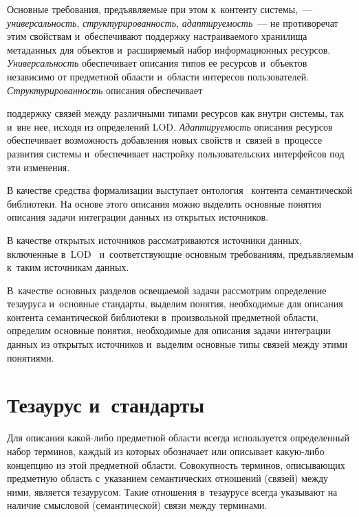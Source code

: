 \begin{multicols}{2}
     Основные требования, предъявляемые при этом к~контенту  
системы,~--- \textit{универсальность}, \textit{структурированность}, 
\textit{адаптируемость}~--- не противоречат этим свойствам и~обеспечивают 
поддержку настраиваемого хранилища метаданных для объектов 
и~расширяемый набор информационных ресурсов. \textit{Универсальность} 
обеспечивает описания типов ее ресурсов и~объектов независимо от 
предметной об\-ласти и~об\-ласти интересов пользователей. 
\textit{Структурированность} описания обеспечивает\linebreak\vspace*{-12pt}

\columnbreak

\noindent
 поддержку связей 
между различными типами ресурсов как внутри сис\-те\-мы, так и~вне нее, 
исходя из определений LOD. \textit{Адаптируемость} описания ресурсов 
обеспечивает возможность добавления новых свойств и~связей в~процессе 
развития сис\-те\-мы и~обеспечивает настройку пользовательских интерфейсов 
под эти изменения. 
{ %

}
     
     В качестве средства формализации выступает онтология~\cite{5-ser} 
контента семантической биб\-лио\-те\-ки. На основе этого описания можно 
выделить основные понятия описания задачи интеграции данных из 
открытых источников.
     
     В качестве открытых источников рас\-смат\-ри\-ва\-ют\-ся источники данных, 
включенные в~LOD~\cite{6-ser} и~соответствующие основным 
требованиям, предъявляемым к~таким источникам данных.
     
     В~качестве основных разделов освещаемой задачи рассмотрим 
определение тезауруса и~основные стандарты, выделим понятия, 
необходимые для описания контента семантической биб\-лио\-те\-ки 
в~произвольной предметной об\-ласти, определим основные понятия, 
необходимые для описания задачи интеграции данных из открытых 
источников и~выделим основные типы связей между этими понятиями.

\section{Тезаурус и~стандарты}

     Для описания какой-либо предметной области всегда используется 
определенный набор терминов, каждый из которых обозначает или 
описывает ка\-кую-ли\-бо концепцию из этой предметной об\-ласти. 
Совокупность терминов, описывающих предметную область с~указанием 
семантических отношений (связей) между ними, является тезаурусом. Такие 
отношения в~тезаурусе всегда указывают на наличие смысловой 
(семантической) связи между терминами.
     

\end{multicols}
